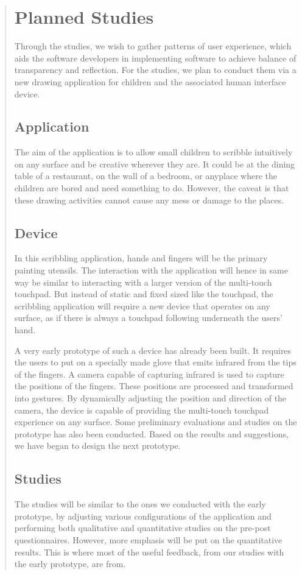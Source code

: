 \documentclass[a4paper,titlepage]{article}
\begin{document}
\begin{quote}
\section{Planned Studies}
\label{sec:studies}
Through the studies, we wish to gather patterns of user experience,
which aids the software developers in implementing software to achieve
balance of transparency and reflection. For the studies, we plan to
conduct them via a new drawing application for children and the
associated human interface device.

\subsection{Application}
The aim of the application is to allow small children to scribble
intuitively on any surface and be creative wherever they are. It could
be at the dining table of a restaurant, on the wall of a bedroom, or
anyplace where the children are bored and need something to
do. However, the caveat is that these drawing activities cannot cause
any mess or damage to the places.

\subsection{Device}
In this scribbling application, hands and fingers will be the primary
painting utensils. The interaction with the application will hence in
same way be similar to interacting with a larger version of the
multi-touch touchpad. But instead of static and fixed sized like the
touchpad, the scribbling application will require a new device that
operates on any surface, as if there is always a touchpad following
underneath the users' hand.

A very early prototype of such a device has already been built. It
requires the users to put on a specially made glove that emits
infrared from the tips of the fingers. A camera capable of capturing
infrared is used to capture the positions of the fingers. These
positions are processed and transformed into gestures. By dynamically
adjusting the position and direction of the camera, the device is
capable of providing the multi-touch touchpad experience on any
surface. Some preliminary evaluations and studies on the prototype has
also been conducted. Based on the results and suggestions, we have
began to design the next prototype.

\subsection{Studies}
The studies will be similar to the ones we conducted with the early
prototype, by adjusting various configurations of the application and
performing both qualitative and quantitative studies on the pre-post
questionnaires. However, more emphasis will be put on the quantitative
results. This is where most of the useful feedback, from our studies
with the early prototype, are from.


\end{quote}
\end{document}

